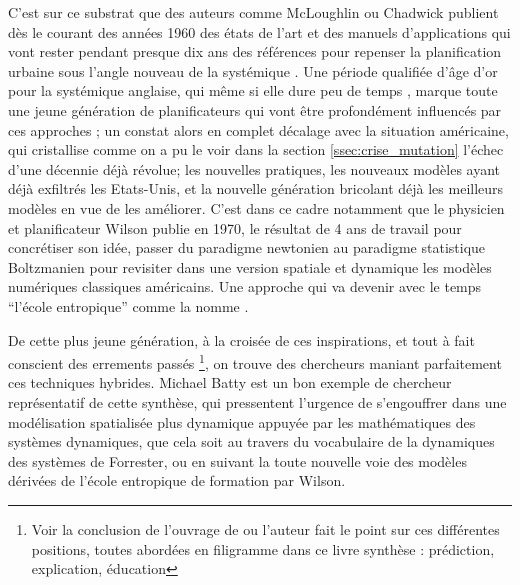 C'est sur ce substrat \autocite[253]{Batty1978} que des auteurs comme McLoughlin ou Chadwick publient dès le courant des années 1960 des états de l'art et des manuels d'applications qui vont rester pendant presque dix ans des références pour repenser la planification urbaine sous l'angle nouveau de la systémique \autocite[719]{Davies1997}. Une période qualifiée d'âge d'or pour la systémique anglaise, qui même si elle dure peu de temps \autocites[726-727]{Davies1997}{McLoughin1985}, marque toute une jeune génération de planificateurs qui vont être profondément influencés par ces approches \autocite[256]{Batty1978}; un constat alors en complet décalage avec la situation américaine, qui cristallise comme on a pu le voir dans la section \ref{ssec:crise_mutation} l'échec d'une décennie déjà révolue; les nouvelles pratiques, les nouveaux modèles ayant déjà exfiltrés les Etats-Unis, et la nouvelle génération bricolant déjà les meilleurs modèles en vue de les améliorer. C'est dans ce cadre notamment que le physicien et planificateur Wilson publie en 1970, le résultat de 4 ans de travail pour concrétiser son idée, passer du paradigme newtonien au paradigme statistique Boltzmanien pour revisiter dans une version spatiale et dynamique les modèles numériques classiques américains. \autocite{Wilson2010} Une approche qui va devenir avec le temps \enquote{l'école entropique} comme la nomme \textcite{Guermond1984}.

De cette plus jeune génération, à la croisée de ces inspirations, et tout à fait conscient des errements passés \footnote{Voir la conclusion de l'ouvrage de \textcite[357]{Batty1976} ou l'auteur fait le point sur ces différentes positions, toutes abordées en filigramme dans ce livre synthèse : prédiction, explication, éducation }, on trouve des chercheurs maniant parfaitement ces techniques hybrides. Michael Batty est un bon exemple de chercheur représentatif de cette synthèse, qui pressentent l'urgence de s'engouffrer dans une modélisation spatialisée plus dynamique \autocite{Batty1971,Batty1972} appuyée par les mathématiques des systèmes dynamiques, que cela soit au travers du vocabulaire de la dynamiques des systèmes de Forrester, ou en suivant la toute nouvelle voie des modèles dérivées de l'école entropique de formation par Wilson.


